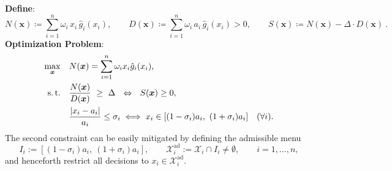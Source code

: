 \documentclass[11pt, a4paper]{article}
\theoremstyle{plain}
\theoremstyle{definition}
\theoremstyle{remark}
\begin{document}
\noindent \textbf{Define}:
\[
N(\bm{x}) \coloneqq \sum_{i=1}^n \omega_i\,x_i\,\hat{g}_i(x_i),\qquad
D(\bm{x}) \coloneqq \sum_{i=1}^n \omega_i\,a_i\,\hat{g}_i(x_i)>0,\qquad
S(\bm{x}) \coloneqq N(\bm{x})-\Delta \cdot D(\bm{x})\ .
\]
\textbf{Optimization Problem}:
\begin{align}
\max_{\bm{x}}\quad & N(\bm{x})=\sum_{i=1}^n \omega_i x_i \hat{g}_i(x_i),\\
\text{s.\,t.}\quad &
\frac{N(\bm{x})}{D(\bm{x})}\ \ge\ \Delta\ \ \Leftrightarrow\ \ S(\bm{x})\ge0,\\
&
\frac{|x_i - a_i|}{a_i} \le \sigma_i \iff x_{i}\in [(1-\sigma_{i} )a_{i},\  (1+\sigma_{i} )a_{i}] \quad (\forall i).
\end{align}
The second constraint can be easily mitigated by defining the admissible menu
\[
I_{i}:=\left[ \left( 1-\sigma_{i} \right) a_{i},\  \left( 1+\sigma_{i} \right) a_{i} \right], \qquad
\mathcal X_i^{\mathrm{ad}} := \mathcal X_i \cap I_i \neq \emptyset,\qquad i=1,\dots,n,
\]
and henceforth restrict all decisions to $x_i\in \mathcal X_i^{\mathrm{ad}}$.
\end{document}
